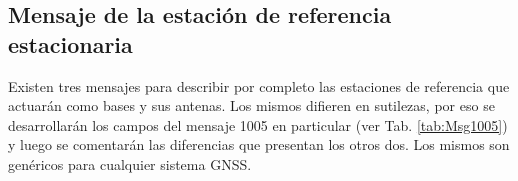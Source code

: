 \documentclass[a4paper,12pt,oneside,onecolumn,final,openright]{book}%
\begin{document}
\subsection{Mensaje de la estación de referencia estacionaria}
	Existen tres mensajes para describir por completo las estaciones de referencia que actuarán como bases y sus antenas.
	Los mismos difieren en sutilezas, por eso se desarrollarán los campos del mensaje 1005 en particular (ver Tab. \ref{tab:Msg1005}) y luego se comentarán las diferencias que presentan los otros dos. Los mismos son genéricos para cualquier sistema GNSS. 
\end{document}
